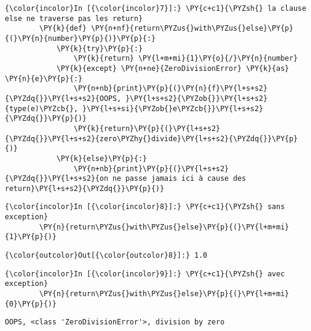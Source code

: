    \begin{Verbatim}[commandchars=\\\{\},frame=single,framerule=0.3mm,rulecolor=\color{cellframecolor}]
{\color{incolor}In [{\color{incolor}7}]:} \PY{c+c1}{\PYZsh{} la clause else ne traverse pas les return}
        \PY{k}{def} \PY{n+nf}{return\PYZus{}with\PYZus{}else}\PY{p}{(}\PY{n}{number}\PY{p}{)}\PY{p}{:}
            \PY{k}{try}\PY{p}{:}
                \PY{k}{return} \PY{l+m+mi}{1}\PY{o}{/}\PY{n}{number}
            \PY{k}{except} \PY{n+ne}{ZeroDivisionError} \PY{k}{as} \PY{n}{e}\PY{p}{:}
                \PY{n+nb}{print}\PY{p}{(}\PY{n}{f}\PY{l+s+s2}{\PYZdq{}}\PY{l+s+s2}{OOPS, }\PY{l+s+s2}{\PYZob{}}\PY{l+s+s2}{type(e)\PYZcb{}, }\PY{l+s+si}{\PYZob{}e\PYZcb{}}\PY{l+s+s2}{\PYZdq{}}\PY{p}{)}
                \PY{k}{return}\PY{p}{(}\PY{l+s+s2}{\PYZdq{}}\PY{l+s+s2}{zero\PYZhy{}divide}\PY{l+s+s2}{\PYZdq{}}\PY{p}{)}
            \PY{k}{else}\PY{p}{:}
                \PY{n+nb}{print}\PY{p}{(}\PY{l+s+s2}{\PYZdq{}}\PY{l+s+s2}{on ne passe jamais ici à cause des return}\PY{l+s+s2}{\PYZdq{}}\PY{p}{)}
\end{Verbatim}


    \begin{Verbatim}[commandchars=\\\{\},frame=single,framerule=0.3mm,rulecolor=\color{cellframecolor}]
{\color{incolor}In [{\color{incolor}8}]:} \PY{c+c1}{\PYZsh{} sans exception}
        \PY{n}{return\PYZus{}with\PYZus{}else}\PY{p}{(}\PY{l+m+mi}{1}\PY{p}{)}
\end{Verbatim}


\begin{Verbatim}[commandchars=\\\{\},frame=single,framerule=0.3mm,rulecolor=\color{cellframecolor}]
{\color{outcolor}Out[{\color{outcolor}8}]:} 1.0
\end{Verbatim}
            
    \begin{Verbatim}[commandchars=\\\{\},frame=single,framerule=0.3mm,rulecolor=\color{cellframecolor}]
{\color{incolor}In [{\color{incolor}9}]:} \PY{c+c1}{\PYZsh{} avec exception}
        \PY{n}{return\PYZus{}with\PYZus{}else}\PY{p}{(}\PY{l+m+mi}{0}\PY{p}{)}
\end{Verbatim}


    \begin{Verbatim}[commandchars=\\\{\},frame=single,framerule=0.3mm,rulecolor=\color{cellframecolor}]
OOPS, <class 'ZeroDivisionError'>, division by zero
\end{Verbatim}

